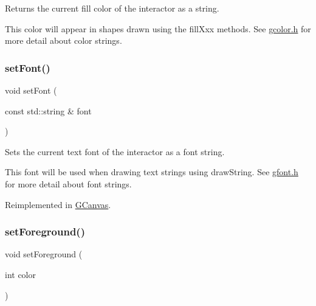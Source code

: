 Returns the current fill color of the interactor as a string. 

This color will appear in shapes drawn using the fill\+Xxx methods. See \mbox{\hyperlink{gcolor_8h_source}{gcolor.\+h}} for more detail about color strings. \mbox{\label{classsgl_1_1GDrawingSurface_a8e096e8818d838aceae1d46d58fb3a7b}} 
\subsubsection{\texorpdfstring{set\+Font()}{setFont()}}
{\footnotesize\ttfamily void set\+Font (\begin{DoxyParamCaption}\item[{const std\+::string \&}]{font }\end{DoxyParamCaption})\hspace{0.3cm}{\ttfamily [virtual]}}



Sets the current text font of the interactor as a font string. 

This font will be used when drawing text strings using draw\+String. See \mbox{\hyperlink{gfont_8h_source}{gfont.\+h}} for more detail about font strings. 

Reimplemented in \mbox{\hyperlink{classsgl_1_1GCanvas_a51367c9fd2709973b1f7238734f93891}{G\+Canvas}}.

\mbox{\label{classsgl_1_1GDrawingSurface_a7daa57084b5811b598fce8726660b328}} 
\subsubsection{\texorpdfstring{set\+Foreground()}{setForeground()}\hspace{0.1cm}{\footnotesize\ttfamily [1/2]}}
{\footnotesize\ttfamily void set\+Foreground (\begin{DoxyParamCaption}\item[{int}]{color }\end{DoxyParamCaption})\hspace{0.3cm}{\ttfamily [virtual]}}



